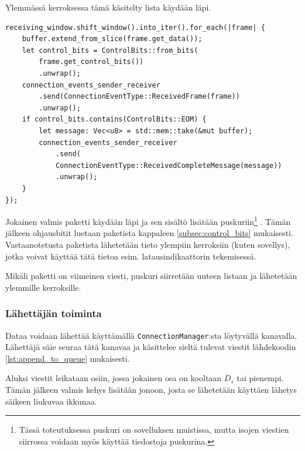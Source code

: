 \documentclass[a4paper,12pt]{article}
\begin{document}
    Ylemmässä kerroksessa tämä käsitelty lista käydään läpi.

    \begin{lstlisting}[caption={Pakettien käsittely}, label={lst:handle_shift_window}]
receiving_window.shift_window().into_iter().for_each(|frame| {
    buffer.extend_from_slice(frame.get_data());
    let control_bits = ControlBits::from_bits(
        frame.get_control_bits())
        .unwrap();
    connection_events_sender_receiver
        .send(ConnectionEventType::ReceivedFrame(frame))
        .unwrap();
    if control_bits.contains(ControlBits::EOM) {
        let message: Vec<u8> = std::mem::take(&mut buffer);
        connection_events_sender_receiver
            .send(
            ConnectionEventType::ReceivedCompleteMessage(message))
            .unwrap();
    }
});\end{lstlisting}

    Jokainen valmis paketti käydään läpi ja sen sisältö lisätään puskuriin\footnote{Tässä toteutuksessa puskuri on sovelluksen muistissa, mutta isojen viestien siirrossa voidaan myös käyttää tiedostoja puskurina.}
    . Tämän jälkeen ohjausbitit luetaan paketista kappaleen \ref{subsec:control_bits} mukaisesti. Vastaanotetusta paketista lähetetään tieto ylempiin kerroksiin (kuten sovellys), jotka voivat käyttää tätä tietoa esim. latausindikaattorin tekemisessä. \par

    Mikäli paketti on viimeinen viesti, puskuri siirretään uuteen listaan ja lähetetään ylemmille kerroksille.

    \subsubsection{Lähettäjän toiminta}\label{subsec:sender_impl}
    Dataa voidaan lähettää käyttämällä \lstinline{ConnectionManager}:sta löytyvällä kanavalla. Lähettäjä säie seuraa tätä kanavaa ja käsittelee sieltä tulevat viestit lähdekoodin \ref{lst:append_to_queue} mukaisesti. \par

    Aluksi viestit leikataan osiin, jossa jokainen osa on kooltaan $D_s$ tai pienempi. Tämän jälkeen valmis kehys lisätään jonoon, josta se lähetetään käyttäen lähetys säikeen liukuvaa ikkunaa.
    
\end{document}
